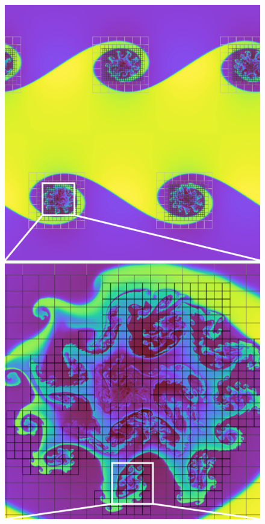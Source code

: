 \documentclass[fleqn,usenatbib]{mnras}
\begin{document}
\begin{figure}
    \begin{center}
    \includegraphics[width=0.85\columnwidth]{quokka_full.pdf}
    \includegraphics[width=0.85\columnwidth]{quokka_zoom.pdf}

\end{center}
\end{figure}
\end{document}
